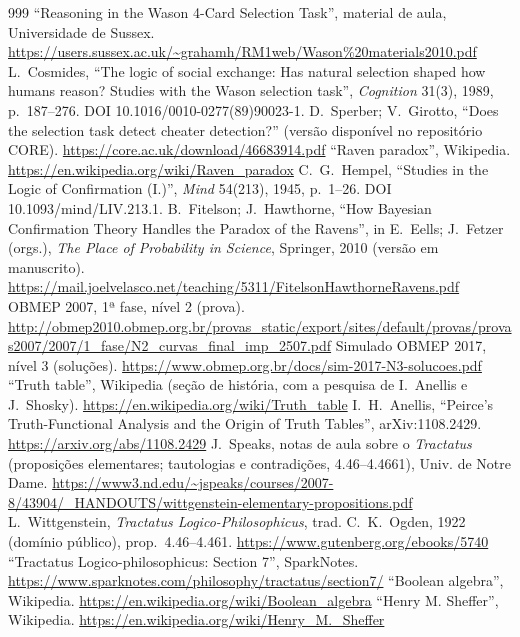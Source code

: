 \begin{thebibliography}{999}
 \enquote{Reasoning in the Wason 4-Card Selection Task}, material de aula, Universidade de Sussex. \url{https://users.sussex.ac.uk/~grahamh/RM1web/Wason\%20materials2010.pdf}
 L.~Cosmides, \enquote{The logic of social exchange: Has natural selection shaped how humans reason? Studies with the Wason selection task}, \emph{Cognition} 31(3), 1989, p.~187--276. DOI 10.1016/0010-0277(89)90023-1.
 D.~Sperber; V.~Girotto, \enquote{Does the selection task detect cheater detection?} (versão disponível no repositório CORE). \url{https://core.ac.uk/download/46683914.pdf}
 \enquote{Raven paradox}, Wikipedia. \url{https://en.wikipedia.org/wiki/Raven_paradox}
 C.~G.~Hempel, \enquote{Studies in the Logic of Confirmation (I.)}, \emph{Mind} 54(213), 1945, p.~1--26. DOI 10.1093/mind/LIV.213.1.
 B.~Fitelson; J.~Hawthorne, \enquote{How Bayesian Confirmation Theory Handles the Paradox of the Ravens}, in E.~Eells; J.~Fetzer (orgs.), \emph{The Place of Probability in Science}, Springer, 2010 (versão em manuscrito). \url{https://mail.joelvelasco.net/teaching/5311/FitelsonHawthorneRavens.pdf}
 OBMEP 2007, 1ª fase, nível 2 (prova). \url{http://obmep2010.obmep.org.br/provas_static/export/sites/default/provas/provas2007/2007/1_fase/N2_curvas_final_imp_2507.pdf}
 Simulado OBMEP 2017, nível 3 (soluções). \url{https://www.obmep.org.br/docs/sim-2017-N3-solucoes.pdf}
 \enquote{Truth table}, Wikipedia (seção de história, com a pesquisa de I.~Anellis e J.~Shosky). \url{https://en.wikipedia.org/wiki/Truth_table}
 I.~H.~Anellis, \enquote{Peirce's Truth-Functional Analysis and the Origin of Truth Tables}, arXiv:1108.2429. \url{https://arxiv.org/abs/1108.2429}
 J.~Speaks, notas de aula sobre o \emph{Tractatus} (proposições elementares; tautologias e contradições, 4.46--4.4661), Univ. de Notre Dame. \url{https://www3.nd.edu/~jspeaks/courses/2007-8/43904/_HANDOUTS/wittgenstein-elementary-propositions.pdf}
 L.~Wittgenstein, \emph{Tractatus Logico-Philosophicus}, trad. C.~K.~Ogden, 1922 (domínio público), prop.~4.46--4.461. \url{https://www.gutenberg.org/ebooks/5740}
 \enquote{Tractatus Logico-philosophicus: Section 7}, SparkNotes. \url{https://www.sparknotes.com/philosophy/tractatus/section7/}
 \enquote{Boolean algebra}, Wikipedia. \url{https://en.wikipedia.org/wiki/Boolean_algebra}
 \enquote{Henry M. Sheffer}, Wikipedia. \url{https://en.wikipedia.org/wiki/Henry_M._Sheffer}

\end{thebibliography}
